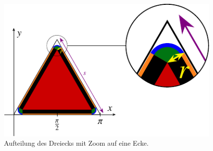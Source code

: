 \begin{figure}
	\centering
	\includegraphics{papers/antennen/images/aufteilungDreieckZoom.pdf}
	\caption{Aufteilung des Dreiecks mit Zoom auf eine Ecke.}
	\label{antennen:tikzdreieckAufteilung}
\end{figure}